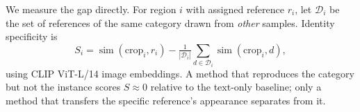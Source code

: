 \documentclass[10pt,twocolumn,letterpaper]{article}
\begin{document}
We measure the gap directly.  For region $i$ with assigned reference
$r_i$, let $\mathcal{D}_i$ be the set of references of the same category
drawn from \emph{other} samples.  Identity specificity is
\begin{equation}
  S_i = \operatorname{sim}(\mathrm{crop}_i, r_i)
      - \tfrac{1}{|\mathcal{D}_i|}\!\!\sum_{d\in\mathcal{D}_i}\!\!
        \operatorname{sim}(\mathrm{crop}_i, d),
  \label{eq:spec}
\end{equation}
using CLIP ViT-L/14 image embeddings.  A method that reproduces the
category but not the instance scores $S\!\approx\!0$ relative to the
text-only baseline; only a method that transfers the specific
reference's appearance separates from it.

\begin{table}[htbp]
\centering
\caption{%
  \textbf{Identity specificity} (Eq.~\ref{eq:spec}, CLIP-I, 375 regions;
  Ours at the default $\tau{=}0.7$).
  Similarity to the assigned reference minus mean similarity to
  same-category distractors.  Attention-gated regional injection is
  indistinguishable from the text-only baseline at either injection
  strength; sub-canvas compositing is not.%
}
\label{tab:specificity}
\end{table}
\end{document}
